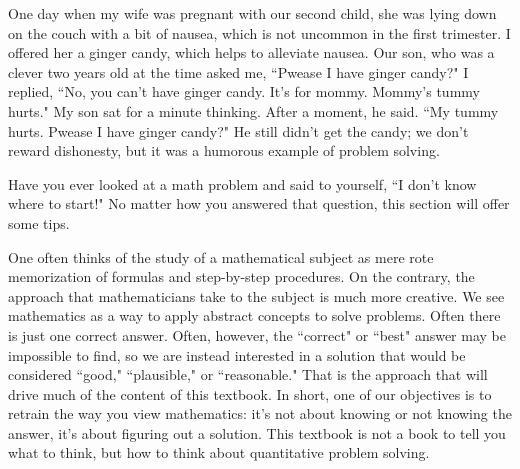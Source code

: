 One day when my wife was pregnant with our second child, she was lying down on the couch with a bit of nausea, which is not uncommon in the first trimester. I offered her a ginger candy, which helps to alleviate nausea. Our son, who was a clever two years old at the time asked me, ``Pwease I have ginger candy?" I replied, ``No, you can't have ginger candy. It's for mommy. Mommy's tummy hurts." My son sat for a minute thinking. After a moment, he said. ``My tummy hurts. Pwease I have ginger candy?" He still didn't get the candy; we don't reward dishonesty, but it was a humorous example of problem solving.

Have you ever looked at a math problem and said to yourself, ``I don't know where to start!" No matter how you answered that question, this section will offer some tips.

One often thinks of the study of a mathematical subject as mere rote memorization of formulas and step-by-step procedures. On the contrary, the approach that mathematicians take to the subject is much more creative. We see mathematics as a way to apply abstract concepts to solve problems. Often there is just one correct answer. Often, however, the ``correct" or ``best" answer may be impossible to find, so we are instead interested in a solution that would be considered ``good," ``plausible," or ``reasonable." That is the approach that will drive much of the content of this textbook. In short, one of our objectives is to retrain the way you view mathematics: it's not about knowing or not knowing the answer, it's about figuring out a solution. This textbook is not a book to tell you what to think, but how to think about quantitative problem solving.

